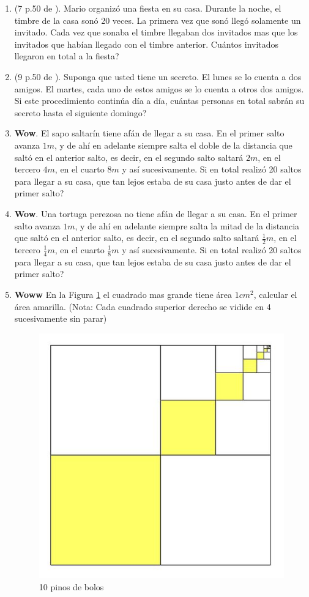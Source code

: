 \begin{enumerate}
	\item (7 p.50 de \cite{creative_problem_solvind_NEGRO}). Mario organizó una fiesta en su casa. Durante la noche, el timbre de la casa sonó 20 veces. La primera vez que sonó llegó solamente un invitado. Cada vez que sonaba el timbre llegaban dos invitados mas que los invitados que habían llegado con el timbre anterior. Cuántos invitados llegaron en total a la fiesta?
	
	\item (9 p.50 de \cite{creative_problem_solvind_NEGRO}). Suponga que usted tiene un secreto. El lunes se lo cuenta a dos amigos. El martes, cada uno de estos amigos se lo cuenta a otros dos amigos. Si este procedimiento continúa día a día, cuántas personas en total sabrán su secreto hasta el siguiente domingo? 
	
	\item \textbf{Wow}. El sapo saltarín tiene afán de llegar a su casa. En el primer salto avanza $1m$, y de ahí en adelante siempre salta el doble de la distancia que saltó en el anterior salto, es decir, en el segundo salto saltará $2m$, en el tercero $4m$, en el cuarto $8m$ y así sucesivamente. Si en total realizó 20 saltos para llegar a su casa, que tan lejos estaba de su casa justo antes de dar el primer salto?
	
	\item \textbf{Wow}. Una tortuga perezosa no tiene afán de llegar a su casa. En el primer salto avanza $1m$, y de ahí en adelante siempre salta la mitad de la distancia que saltó en el anterior salto, es decir, en el segundo salto saltará $\frac{1}{2}m$, en el tercero $\frac{1}{4} m$, en el cuarto $\frac{1}{8} m$ y así sucesivamente. Si en total realizó 20 saltos para llegar a su casa, que tan lejos estaba de su casa justo antes de dar el primer salto?
	
	\item \textbf{Woww} En la Figura \ref{secuenciaCuarto} el cuadrado mas grande tiene área $1 {cm}^2$, calcular el área amarilla. (Nota: Cada cuadrado superior derecho se vidide en 4 sucesivamente sin parar)
	
		\begin{figure}[H]
			\centering
			\includegraphics[width=0.4\linewidth]{TN/imgs/secuenciaCuartoEnCuarto}
			\caption{10 pinos de bolos}
			\label{secuenciaCuarto}
		\end{figure}
	
\end{enumerate}
\newpage


